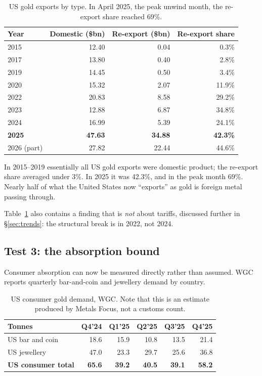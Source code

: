 \documentclass[11pt,a4paper]{article}
\begin{document}
\begin{table}[h]
\centering
\begin{tabular}{@{}lrrr@{}}
\toprule
\textbf{Year} & \textbf{Domestic (\$bn)} & \textbf{Re-export (\$bn)} & \textbf{Re-export share} \\
\midrule
2015 & 12.40 & 0.04 & 0.3\% \\
2017 & 13.80 & 0.40 & 2.8\% \\
2019 & 14.45 & 0.50 & 3.4\% \\
2020 & 15.32 & 2.07 & 11.9\% \\
2022 & 20.83 & 8.58 & 29.2\% \\
2023 & 12.88 & 6.87 & 34.8\% \\
2024 & 16.99 & 5.39 & 24.1\% \\
\textbf{2025} & \textbf{47.63} & \textbf{34.88} & \textbf{42.3\%} \\
2026 (part) & 27.82 & 22.44 & 44.6\% \\
\bottomrule
\end{tabular}
\caption{US gold exports by type. In April 2025, the peak unwind month, the re-export share
reached 69\%.}
\label{tab:reexport}
\end{table}

In 2015--2019 essentially all US gold exports were domestic product; the re-export share
averaged under 3\%. In 2025 it was 42.3\%, and in the peak month 69\%. Nearly half of what the
United States now ``exports'' as gold is foreign metal passing through.

Table~\ref{tab:reexport} also contains a finding that is \emph{not} about tariffs, discussed
further in \S\ref{sec:trends}: the structural break is in 2022, not 2024.

\subsection{Test 3: the absorption bound}

Consumer absorption can now be measured directly rather than assumed. WGC reports quarterly
bar-and-coin and jewellery demand by country.

\begin{table}[h]
\centering
\begin{tabular}{@{}lrrrrr@{}}
\toprule
\textbf{Tonnes} & \textbf{Q4'24} & \textbf{Q1'25} & \textbf{Q2'25} & \textbf{Q3'25} &
\textbf{Q4'25} \\
\midrule
US bar and coin & 18.6 & 15.9 & 10.8 & 13.5 & 21.4 \\
US jewellery & 47.0 & 23.3 & 29.7 & 25.6 & 36.8 \\
\textbf{US consumer total} & \textbf{65.6} & \textbf{39.2} & \textbf{40.5} & \textbf{39.1} &
\textbf{58.2} \\
\bottomrule
\end{tabular}
\caption{US consumer gold demand, WGC. Note that this is an estimate produced by Metals Focus,
not a customs count.}
\end{table}
\end{document}
